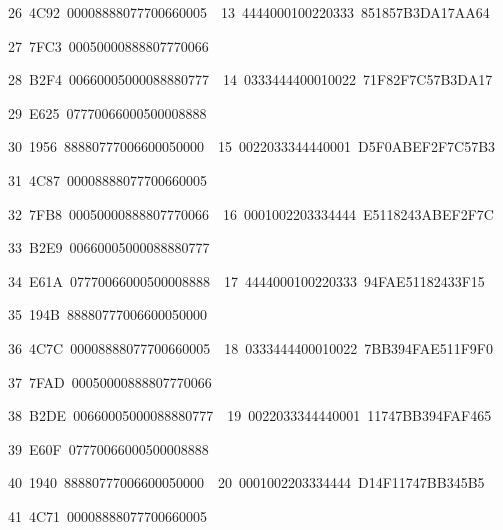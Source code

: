 \documentclass[a4paper,oneside,english]{amsart}
\numberwithin{equation}{section}
\numberwithin{figure}{section}
\newenvironment{lyxcode}
{\par\begin{list}{}{
\setlength{\rightmargin}{\leftmargin}
\setlength{\listparindent}{0pt}\raggedright
\setlength{\itemsep}{0pt}
\setlength{\parsep}{0pt}
\normalfont\ttfamily}\item[]}
{\end{list}}
\begin{document}
\begin{table}
\begin{lyxcode}
{\footnotesize{}~26~4C92~00008888077700660005~~13~4444000100220333~851857B3DA17AA64}{\footnotesize \par}

{\footnotesize{}~27~7FC3~00050000888807770066}{\footnotesize \par}

{\footnotesize{}~28~B2F4~00660005000088880777~~14~0333444400010022~71F82F7C57B3DA17}{\footnotesize \par}

{\footnotesize{}~29~E625~07770066000500008888}{\footnotesize \par}

{\footnotesize{}~30~1956~88880777006600050000~~15~0022033344440001~D5F0ABEF2F7C57B3}{\footnotesize \par}

{\footnotesize{}~31~4C87~00008888077700660005}{\footnotesize \par}

{\footnotesize{}~32~7FB8~00050000888807770066~~16~0001002203334444~E5118243ABEF2F7C}{\footnotesize \par}

{\footnotesize{}~33~B2E9~00660005000088880777}{\footnotesize \par}

{\footnotesize{}~34~E61A~07770066000500008888~~17~4444000100220333~94FAE51182433F15}{\footnotesize \par}

{\footnotesize{}~35~194B~88880777006600050000}{\footnotesize \par}

{\footnotesize{}~36~4C7C~00008888077700660005~~18~0333444400010022~7BB394FAE511F9F0}{\footnotesize \par}

{\footnotesize{}~37~7FAD~00050000888807770066}{\footnotesize \par}

{\footnotesize{}~38~B2DE~00660005000088880777~~19~0022033344440001~11747BB394FAF465}{\footnotesize \par}

{\footnotesize{}~39~E60F~07770066000500008888}{\footnotesize \par}

{\footnotesize{}~40~1940~88880777006600050000~~20~0001002203334444~D14F11747BB345B5}{\footnotesize \par}

{\footnotesize{}~41~4C71~00008888077700660005}{\footnotesize \par}


\end{lyxcode}
\end{table}
\end{document}
